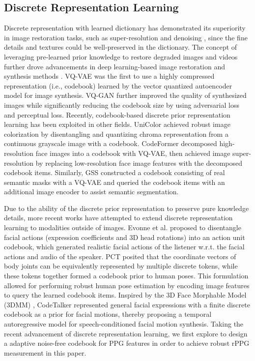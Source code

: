 \subsection{Discrete Representation Learning}
\label{subsec:prior_learning}

Discrete representation with learned dictionary has demonstrated its superiority in image restoration tasks, such as super-resolution \cite{YangISRVSR2010, TimofteANRFESR2013, AhmedCSCUW2019, GuoTCSVT24} and denoising \cite{EladIDVSROLD2006}, since the fine details and textures could be well-preserved in the dictionary. The concept of leveraging pre-learned prior knowledge to restore degraded images and videos further drove advancements in deep learning-based image restoration \cite{JoPSISRULT2021} and synthesis methods \cite{OordVQVAE2017, RazaviVQVAE22019, EsserVQGAN2021}. VQ-VAE \cite{OordVQVAE2017} was the first to use a highly compressed representation (i.e., codebook) learned by the vector quantized autoencoder model for image synthesis. VQ-GAN \cite{EsserVQGAN2021} further improved the quality of synthesized images while significantly reducing the codebook size by using adversarial loss and perceptual loss. Recently, codebook-based discrete prior representation learning has been exploited in other fields. UniColor \cite{HuangUniColor2022} achieved robust image colorization by disentangling and quantizing chroma representation from a continuous grayscale image with a codebook. CodeFormer \cite{ZhouCodeFormer2022} decomposed high-resolution face images into a codebook with VQ-VAE, then achieved image super-resolution by replacing low-resolution face image features with the decomposed codebook items. Similarly, GSS \cite{ChenGSS2023} constructed a codebook consisting of real semantic masks with a VQ-VAE and queried the codebook items with an additional image encoder to assist semantic segmentation. 

Due to the ability of the discrete prior representation to preserve pure knowledge details, more recent works have attempted to extend discrete representation learning to modalities outside of images. Evonne et al. \cite{NgL2L2022} proposed to disentangle facial actions (expression coefficients and 3D head rotations) into an action unit codebook, which generated realistic facial actions of the listener w.r.t. the facial actions and audio of the speaker. PCT \cite{GengPCT2023} posited that the coordinate vectors of body joints can be equivalently represented by multiple discrete tokens, while these tokens together formed a codebook prior to human poses. This formulation allowed for performing robust human pose estimation by encoding image features to query the learned codebook items. Inspired by the 3D Face Morphable Model (3DMM) \cite{Li3DMM2017}, CodeTalker \cite{XingCodetalker2023} represented general facial expressions with a finite discrete codebook as a prior for facial motions, thereby proposing a temporal autoregressive model for speech-conditioned facial motion synthesis. Taking the recent advancement of discrete representation learning, we first explore to design a adaptive noise-free codebook for PPG features in order to achieve robust rPPG measurement in this paper.


